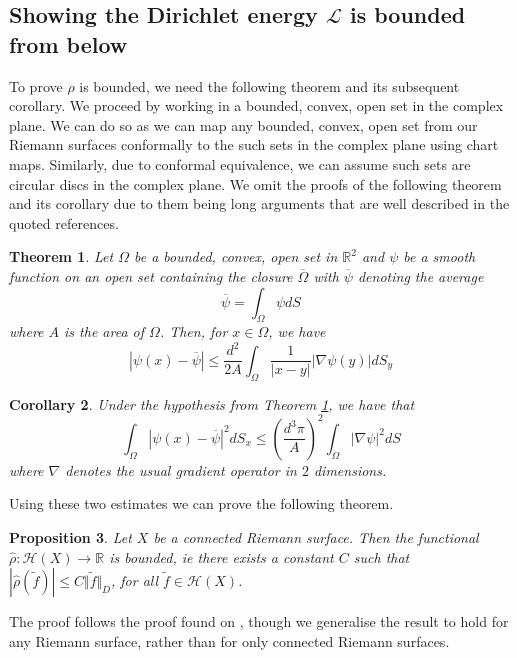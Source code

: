 \documentclass[11pt]{report}
\newtheorem{thm}{Theorem}[section]
\newtheorem{prop}[thm]{Proposition}
\newtheorem{cor}[thm]{Corollary}
\theoremstyle{definition}
\begin{document}
\subsection{Showing the Dirichlet energy $\mathcal{L}$ is bounded from below}
To prove $\hat{\rho}$ is bounded, we need the following theorem and its subsequent corollary. We proceed by working in a bounded, convex, open set in the complex plane. We can do so as we can map any bounded, convex, open set from our Riemann surfaces conformally to the such sets in the complex plane using chart maps. Similarly, due to conformal equivalence, we can assume such sets are circular discs in the complex plane. We omit the proofs of the following theorem and its corollary due to them being long arguments that are well described in the quoted references.
\begin{thm}\cite[Theorem 11]{donaldson}\label{quotedTheorem11}
  Let $\Omega$ be a bounded, convex, open set in $\mathbb{R}^2$ and $\psi$ be a smooth function on an open set containing the closure $\overline{\Omega}$ with $\overline{\psi}$ denoting the average 
  \[\overline{\psi} = \int_{\Omega}\psi dS\] 
  where $A$ is the area of $\Omega$. Then, for $x \in \Omega$, we have 
  \[|\psi(x) - \overline{\psi}| \leq \frac{d^2}{2A}\int_\Omega \frac{1}{|x - y|}|\nabla\psi(y)|dS_y\]
\end{thm}
\begin{cor}\cite[Corollary 6]{donaldson}\label{quotedCorollary6}
  Under the hypothesis from Theorem \ref{quotedTheorem11}, we have that 
  \[\int_\Omega |\psi(x) - \overline{\psi}|^2 dS_x\leq \left(\frac{d^3\pi}{A}\right)^2\int_\Omega |\nabla\psi|^2 dS\]
  where $\nabla$ denotes the usual gradient operator in $2$ dimensions.
\end{cor}
Using these two estimates we can prove the following theorem.
\begin{prop}\label{PartitionOfUnity}
  Let $X$ be a connected Riemann surface. Then the functional $\hat{\rho}:\mathcal{H}(X) \rightarrow \mathbb{R}$ is bounded, ie there exists a constant $C$ such that $|\hat{\rho}(\tilde{f})|  \leq C \Vert \tilde{f} \Vert_D$, for all $\tilde{f} \in \mathcal{H}(X)$.
\end{prop}
The proof follows the proof found on \cite[p.125]{donaldson}, though we generalise the result to hold for any Riemann surface, rather than for only connected Riemann surfaces.
\end{document}
